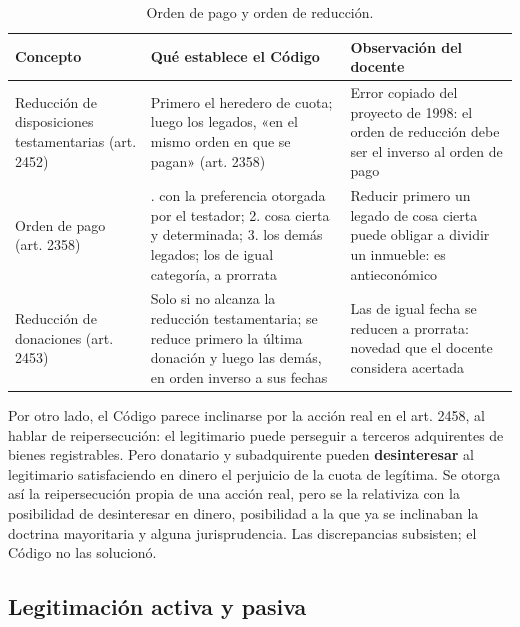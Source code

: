 \documentclass[12pt,oneside]{book}
\begin{document}
\begin{table}[H]
\centering
\small
\begin{tabularx}{\textwidth}{
    >{\raggedright\arraybackslash}p{3.2cm}
    >{\raggedright\arraybackslash}X
    >{\raggedright\arraybackslash}X
}
\toprule
\textbf{Concepto} & \textbf{Qué establece el Código} & \textbf{Observación del docente} \\
\midrule
Reducción de disposiciones testamentarias (art. 2452) & Primero el heredero de cuota; luego los legados, «en el mismo orden en que se pagan» (art. 2358) & Error copiado del proyecto de 1998: el orden de reducción debe ser el inverso al orden de pago \\
\addlinespace
Orden de pago (art. 2358) & 1.\textordmasculine{} con la preferencia otorgada por el testador; 2.\textordmasculine{} cosa cierta y determinada; 3.\textordmasculine{} los demás legados; los de igual categoría, a prorrata & Reducir primero un legado de cosa cierta puede obligar a dividir un inmueble: es antieconómico \\
\addlinespace
Reducción de donaciones (art. 2453) & Solo si no alcanza la reducción testamentaria; se reduce primero la última donación y luego las demás, en orden inverso a sus fechas & Las de igual fecha se reducen a prorrata: novedad que el docente considera acertada \\
\bottomrule
\end{tabularx}
\caption*{Orden de pago y orden de reducción.}
\end{table}

Por otro lado, el Código parece inclinarse por la acción real en el art. 2458, al hablar de reipersecución: el legitimario puede perseguir a terceros adquirentes de bienes registrables. Pero donatario y subadquirente pueden \textbf{desinteresar} al legitimario satisfaciendo en dinero el perjuicio de la cuota de legítima. Se otorga así la reipersecución propia de una acción real, pero se la relativiza con la posibilidad de desinteresar en dinero, posibilidad a la que ya se inclinaban la doctrina mayoritaria y alguna jurisprudencia. Las discrepancias subsisten; el Código no las solucionó.

\subsection{Legitimación activa y pasiva}
\end{document}
